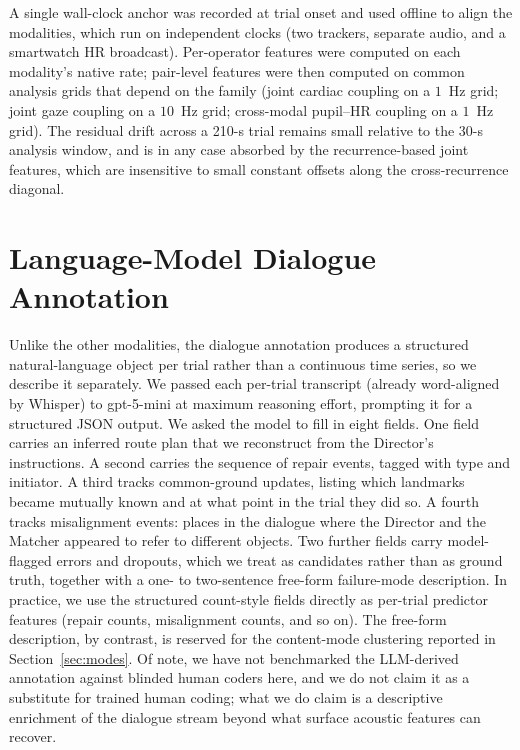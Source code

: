 A single wall-clock anchor was recorded at trial onset and used offline to align the modalities, which run on independent clocks (two trackers, separate audio, and a smartwatch HR broadcast). Per-operator features were computed on each modality's native rate; pair-level features were then computed on common analysis grids that depend on the family (joint cardiac coupling on a $1$~Hz grid; joint gaze coupling on a $10$~Hz grid; cross-modal pupil--HR coupling on a $1$~Hz grid). The residual drift across a 210-s trial remains small relative to the 30-s analysis window, and is in any case absorbed by the recurrence-based joint features, which are insensitive to small constant offsets along the cross-recurrence diagonal.

\section{Language-Model Dialogue Annotation}\label{sec:llm-anno}
Unlike the other modalities, the dialogue annotation produces a structured natural-language object per trial rather than a continuous time series, so we describe it separately. We passed each per-trial transcript (already word-aligned by Whisper) to gpt-5-mini \cite{openai2025gpt5} at maximum reasoning effort, prompting it for a structured JSON output. We asked the model to fill in eight fields. One field carries an inferred route plan that we reconstruct from the Director's instructions. A second carries the sequence of repair events, tagged with type and initiator. A third tracks common-ground updates, listing which landmarks became mutually known and at what point in the trial they did so. A fourth tracks misalignment events: places in the dialogue where the Director and the Matcher appeared to refer to different objects. Two further fields carry model-flagged errors and dropouts, which we treat as candidates rather than as ground truth, together with a one- to two-sentence free-form failure-mode description. In practice, we use the structured count-style fields directly as per-trial predictor features (repair counts, misalignment counts, and so on). The free-form description, by contrast, is reserved for the content-mode clustering reported in Section~\ref{sec:modes}. Of note, we have not benchmarked the LLM-derived annotation against blinded human coders here, and we do not claim it as a substitute for trained human coding; what we do claim is a descriptive enrichment of the dialogue stream beyond what surface acoustic features can recover.

